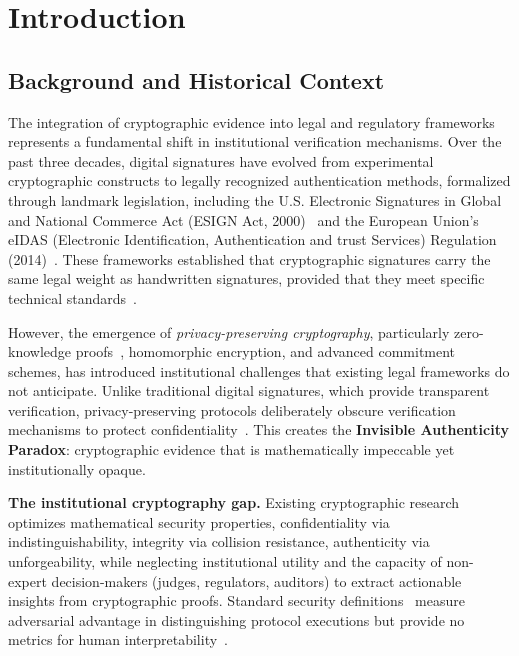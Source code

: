 \documentclass{ieeeaccess}
\begin{document}
\titlepgskip=-21pt

\maketitle

\section{Introduction}\label{sec:introduction}
\subsection{Background and Historical Context}

The integration of cryptographic evidence into legal and regulatory frameworks represents a fundamental shift in institutional verification mechanisms. Over the past three decades, digital signatures have evolved from experimental cryptographic constructs to legally recognized authentication methods, formalized through landmark legislation, including the U.S. Electronic Signatures in Global and National Commerce Act (ESIGN Act, 2000)~\cite{ESIGN00} and the European Union's eIDAS (Electronic Identification, Authentication and trust Services) Regulation (2014)~\cite{eIDAS14}. These frameworks established that cryptographic signatures carry the same legal weight as handwritten signatures, provided that they meet specific technical standards~\cite{Kerr04,Mason07}.

However, the emergence of \emph{privacy-preserving cryptography}, particularly zero-knowledge proofs~\cite{GMR85}, homomorphic encryption, and advanced commitment schemes, has introduced institutional challenges that existing legal frameworks do not anticipate. Unlike traditional digital signatures, which provide transparent verification, privacy-preserving protocols deliberately obscure verification mechanisms to protect confidentiality~\cite{Bonneau16}. This creates the \textbf{Invisible Authenticity Paradox}: cryptographic evidence that is mathematically impeccable yet institutionally opaque.

\textbf{The institutional cryptography gap.} Existing cryptographic research optimizes mathematical security properties, confidentiality via indistinguishability, integrity via collision resistance, authenticity via unforgeability, while neglecting institutional utility and the capacity of non-expert decision-makers (judges, regulators, auditors) to extract actionable insights from cryptographic proofs. Standard security definitions~\cite{GMR85} measure adversarial advantage in distinguishing protocol executions but provide no metrics for human interpretability~\cite{Zohar15,Grimmelmann15}.
\end{document}
